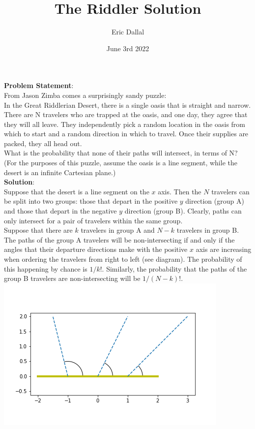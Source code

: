 \documentclass[10pt,a4paper]{article}
\title{The Riddler Solution}
\date{June 3rd 2022}
\author{Eric Dallal}
\begin{document}
\maketitle
\textbf{Problem Statement}:\\

From Jason Zimba comes a surprisingly sandy puzzle:\\

In the Great Riddlerian Desert, there is a single oasis that is straight and narrow. There are N travelers who are trapped at the oasis, and one day, they agree that they will all leave. They independently pick a random location in the oasis from which to start and a random direction in which to travel. Once their supplies are packed, they all head out.\\

What is the probability that none of their paths will intersect, in terms of N? (For the purposes of this puzzle, assume the oasis is a line segment, while the desert is an infinite Cartesian plane.)\\

\textbf{Solution}:\\

Suppose that the desert is a line segment on the $x$ axis. Then the $N$ travelers can be split into two groups: those that depart in the positive $y$ direction (group A) and those that depart in the negative $y$ direction (group B). Clearly, paths can only intersect for a pair of travelers within the same group.\\

Suppose that there are $k$ travelers in group A and $N-k$ travelers in group B. The paths of the group A travelers will be non-intersecting if and only if the angles that their departure directions make with the positive $x$ axis are increasing when ordering the travelers from right to left (see diagram). The probability of this happening by chance is $1/k!$. Similarly, the probability that the paths of the group B travelers are non-intersecting will be $1/(N-k)!$.\\

\includegraphics[width=\textwidth]{Angles}
\end{document}
